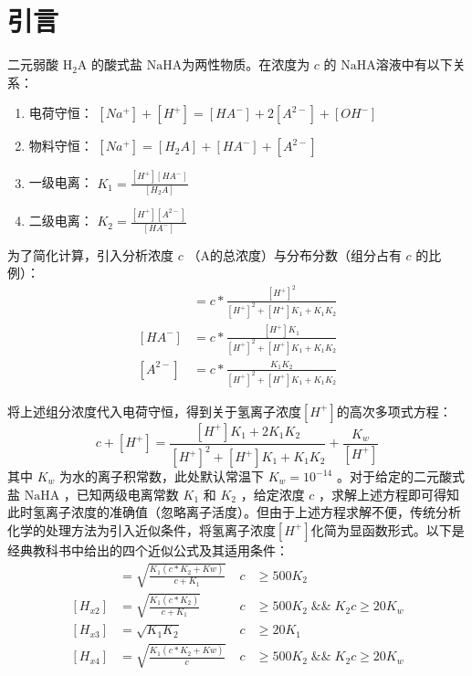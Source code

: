 \documentclass[UTF-8]{ctexart}
\newcommand{\0}{\boldsymbol{0}}
\begin{document}
\pagebreak

    \kaishu \fontsize{11pt}{16pt}
\section{引言}
二元弱酸 $\text{H}_2\text{A}$ 的酸式盐 $\text{NaHA} $为两性物质。在浓度为 $c$ 的 $\text{NaHA} $溶液中有以下关系：
\begin{enumerate}
    \item 电荷守恒： $[Na^+]+[H^+]=[HA^-]+2[A^{2-}]+[OH^-] $
    \item 物料守恒： $[Na^+]=[H_2A]+[HA^-]+[A^{2-}] $
    \item 一级电离： $K_1=\frac{[H^+][HA^-]} {[H_2A]} $
    \item 二级电离： $K_2=\frac{[H^+][A^{2-}]} {[HA^-]} $
\end{enumerate}
为了简化计算，引入分析浓度 $c$  （A的总浓度）与分布分数（组分占有 $c$ 的比例）：
\begin{align*} 
    [H_2A]&=c*\frac{[H^+]^2} {[H^+]^2+[H^+]K_1+K_1K_2}       \\ 
    [HA^-]&=c*\frac{[H^+]K_1} {[H^+]^2+[H^+]K_1+K_1K_2}       \\ 
    [A^{2-}]&=c*\frac{K_1K_2} {[H^+]^2+[H^+]K_1+K_1K_2}       
\end{align*}

将上述组分浓度代入电荷守恒，得到关于氢离子浓度$ [H^+] $的高次多项式方程：
\begin{equation} \label{基本方程}
    c+[H^+]= \frac{[H^+]K_1+2K_1K_2} {[H^+]^2+[H^+]K_1+K_1K_2} +\frac{K_w}{[H^+]}
\end{equation}
其中 $K_w$ 为水的离子积常数，此处默认常温下 $K_w=10^{-14}$ 。对于给定的二元酸式盐 $\text{NaHA}$ ，已知两级电离常数 $K_1$ 和 $K_2$ ，给定浓度 $c$  ，求解上述方程即可得知此时氢离子浓度的准确值（忽略离子活度）。但由于上述方程求解不便，传统分析化学的处理方法为引入近似条件，将氢离子浓度$ [H^+] $化简为显函数形式。以下是经典教科书中给出的四个近似公式及其适用条件：
\begin{align*}      
    [H_{x1}]&= \sqrt{     \frac{K_1(c *K_2+Kw)}  {c+K_1} }\;&c&\geq500K_2\\   
    [H_{x2}]&= \sqrt{     \frac{K_1(c *K_2)}  {c+K_1} }     &c&\geq500K_2 \;\&\&\;K_{2}c\geq20K_w \\     
    [H_{x3}]&= \sqrt{     K_1K_2 } &c&\geq20K_1\\   
    [H_{x4}]&= \sqrt{     \frac{K_1(c *K_2+Kw)}  {c} } &c&\geq500K_2\;\&\&\;K_{2}c\geq20K_w
\end{align*} 
  
\end{document}
